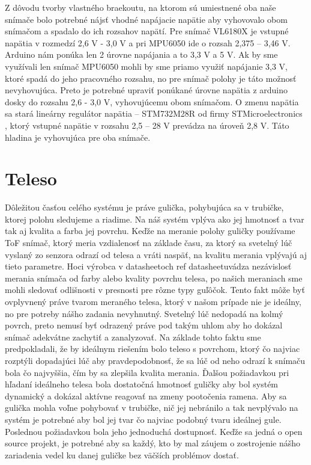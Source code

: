 Z dôvodu tvorby vlastného braekoutu, na ktorom sú umiestnené oba naše snímače bolo potrebné nájsť vhodné napájacie napätie aby vyhovovalo obom snímačom a spadalo do ich rozsahov napätí. Pre snímač VL6180X je vstupné napätia v rozmedzí 2,6 V - 3,0 V a pri MPU6050 ide o rozsah 2,375 – 3,46 V. Arduino nám ponúka len 2 úrovne napájania a to 3,3 V a 5 V. Ak by sme využívali len snímač MPU6050 mohli by sme priamo využiť napájanie 3,3 V, ktoré spadá do jeho pracovného rozsahu, no pre snímač polohy je táto možnosť nevyhovujúca. Preto je potrebné upraviť ponúkané úrovne napätia z arduino dosky do rozsahu 2,6 - 3,0 V, vyhovujúcemu obom snímačom. O zmenu napätia sa stará lineárny regulátor napätia – STM732M28R od firmy STMicroelectronics , ktorý vstupné napätie v rozsahu 2,5 – 28 V prevádza na úroveň 2,8 V. Táto hladina je vyhovujúca pre oba snímače.   


\section{Teleso}
\label{kap:2.3}

Dôležitou časťou celého systému je práve gulička, pohybujúca sa v trubičke, ktorej polohu sledujeme a riadime. Na náš systém vplýva ako jej hmotnosť a tvar tak aj kvalita a farba jej povrchu. Keďže na meranie polohy guličky používame ToF snímač, ktorý meria vzdialenosť na základe času, za ktorý sa svetelný lúč vyslaný zo senzora odrazí od telesa a vráti naspäť, na kvalitu merania vplývajú aj tieto parametre. Hoci výrobca v datasheetoch {ref datasheet}uvádza nezávislosť merania snímača od farby alebo kvality povrchu telesa, po našich meraniach sme mohli sledovať odlišnosti v presnosti pre rôzne typy guľôčok. Tento fakt môže byť ovplyvnený práve tvarom meraného telesa, ktorý v našom prípade nie je ideálny, no pre potreby nášho zadania nevyhnutný. Svetelný lúč nedopadá na kolmý povrch, preto nemusí byť odrazený práve pod takým uhlom aby ho dokázal snímač adekvátne zachytiť a zanalyzovať. Na základe tohto faktu sme predpokladali, že by ideálnym riešením bolo teleso s povrchom, ktorý čo najviac rozptýli dopadajúci lúč aby pravdepodobnosť, že sa lúč od neho odrazí k snímaču bola čo najvyššia, čím by sa zlepšila kvalita merania. Ďalšou požiadavkou pri hľadaní ideálneho telesa bola dostatočná hmotnosť guličky aby bol systém dynamický a dokázal aktívne reagovať na zmeny pootočenia ramena. Aby sa gulička mohla voľne pohybovať v trubičke, nič jej nebránilo a tak nevplývalo na systém je potrebné aby bol jej tvar čo najviac podobný tvaru ideálnej gule. Poslednou požiadavkou bola jeho jednoduchá dostupnosť. Keďže sa jedná o open source projekt, je potrebné aby sa každý, kto by mal záujem o zostrojenie nášho zariadenia vedel ku danej guličke bez väčších problémov dostať.

